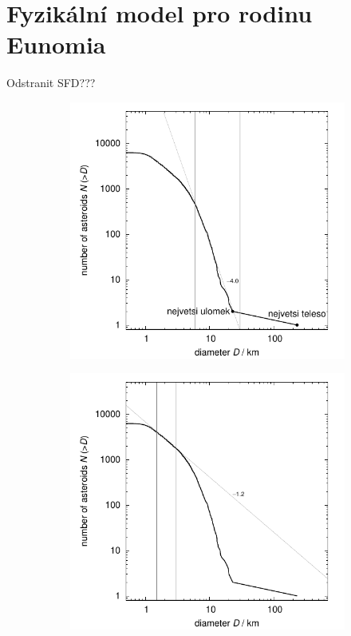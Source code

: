 \documentclass[A4paper, 12pt, oneside]{book}
\begin{document}
\pagebreak

\section{Fyzikální model pro rodinu Eunomia}

Odstranit SFD???
\begin{figure}
	\centering
	\begin{subfigure}[b]{0.45\textwidth}
	\includegraphics[width=\textwidth]{obr/size_distribution}
	\end{subfigure}
	\begin{subfigure}[b]{0.45\textwidth}
	\includegraphics[width=\textwidth]{obr/size_distribution_SMALLD}

\end{subfigure}
\end{figure}
\end{document}
